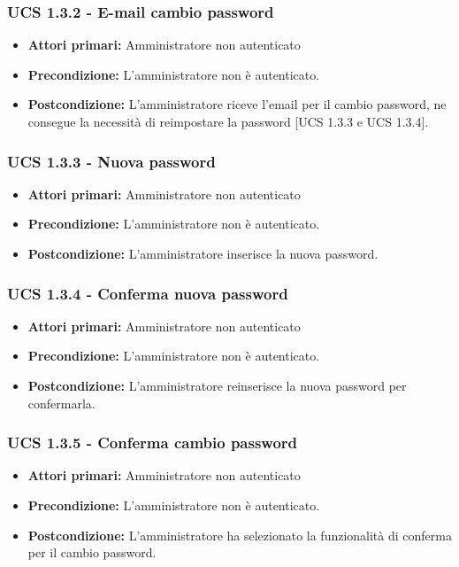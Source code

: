\subsubsection{UCS 1.3.2 - E-mail cambio password}
\begin{itemize}
\item \textbf{Attori primari:} Amministratore non autenticato
\item \textbf{Precondizione:} L'amministratore non è autenticato.
\item \textbf{Postcondizione:} L'amministratore riceve l'email per il cambio password, ne consegue la necessità di reimpostare la password [UCS 1.3.3 e UCS 1.3.4].
\end{itemize}

\subsubsection{UCS 1.3.3 - Nuova password}
\begin{itemize}
\item \textbf{Attori primari:} Amministratore non autenticato
\item \textbf{Precondizione:}  L'amministratore non è autenticato.
\item \textbf{Postcondizione:} L'amministratore inserisce la nuova password.
\end{itemize}

\subsubsection{UCS 1.3.4 - Conferma nuova password}
\begin{itemize}
\item \textbf{Attori primari:} Amministratore non autenticato
\item \textbf{Precondizione:} L'amministratore non è autenticato.
\item \textbf{Postcondizione:} L'amministratore reinserisce la nuova password per confermarla.
\end{itemize}

\subsubsection{UCS 1.3.5 - Conferma cambio password}%
\begin{itemize}
\item \textbf{Attori primari:} Amministratore non autenticato
\item \textbf{Precondizione:} L'amministratore non è autenticato.
\item \textbf{Postcondizione:} L'amministratore ha selezionato la funzionalità di conferma per il cambio password.
\end{itemize}
